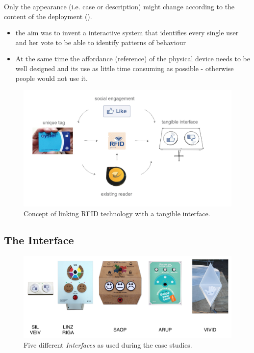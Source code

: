 Only the appearance (i.e. case or description) might change according to the content of the deployment (\label{interfaces}).
\begin{itemize}
\item the aim was to invent a interactive system that identifies every single user and her vote to be able to identify patterns of behaviour
\item At the same time the affordance (reference) of the physical device needs to be well designed and its use as little time consuming as possible - otherwise people would not use it.
\end{itemize}

\begin{figure}[!h] 
\centering
\includegraphics[width=\textwidth]{Illustrations/InteractionConcept.png}
\caption [Interaction design concept] {Concept of linking RFID technology with a tangible interface. }
\label{interfaces}
\end{figure}


\subsection{The Interface}

\begin{figure}[!h] 
\centering
\includegraphics[width=\textwidth]{Illustrations/Interfaces.png}
\caption [Tangible User Interfaces] {Five different \textit{Interfaces} as used during the case studies.}
\label{interfaces}
\end{figure}

